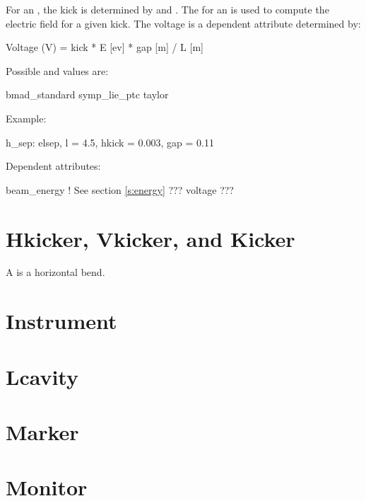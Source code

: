 For an , the kick is determined by  and
. The  for an  is used to compute
the electric field for a given kick. The voltage is a dependent
attribute determined by:
\begin{example}
  Voltage (V) = kick * E [ev] * gap [m] / L [m] 
\end{example}


\vskip0.2in \noindent
Possible  and  values are:
\vskip 0.01in
\begin{example}
  bmad\_standard
  symp\_lie\_ptc
  taylor
\end{example}

\vskip0.2in \noindent
Example:
\begin{example}
  h_sep: elsep, l = 4.5, hkick = 0.003, gap = 0.11
\end{example}

\vskip0.2in \noindent
Dependent attributes:
\begin{example}
  beam\_energy  ! See section \ref{s:energy}
  ??? voltage ???
\end{example}

\section{Hkicker, Vkicker, and Kicker}
\label{s:kicker}

A  is a horizontal bend. 

\section{Instrument}
\label{s:inst}

\section{Lcavity}
\label{s:lcav}

\section{Marker}
\label{s:mark}

\section{Monitor}
\label{s:mon}


